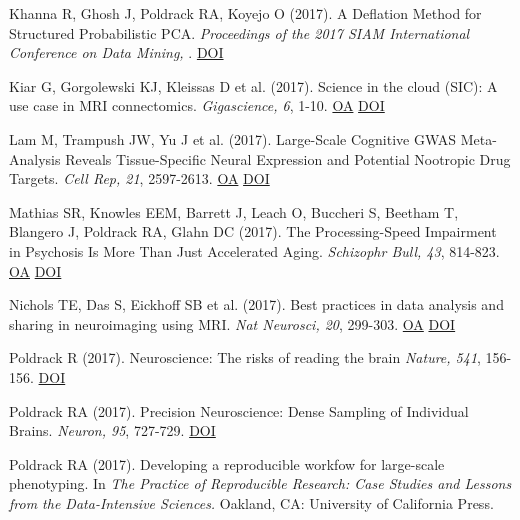 \documentclass[10pt, letterpaper]{article}
\begin{document}
Khanna R, Ghosh J, Poldrack RA,  Koyejo O (2017). A Deflation Method for Structured Probabilistic PCA. \textit{Proceedings of the 2017 SIAM International Conference on Data Mining, }. \href{http://dx.doi.org/10.1137/1.9781611974973.60}{DOI} \vspace{2mm}

Kiar G, Gorgolewski KJ, Kleissas D et al. (2017). Science in the cloud (SIC): A use case in MRI connectomics. \textit{Gigascience, 6}, 1-10. \href{https://www.ncbi.nlm.nih.gov/pmc/articles/PMC5467033}{OA} \href{http://dx.doi.org/10.1093/gigascience/gix013}{DOI} \vspace{2mm}

Lam M, Trampush JW, Yu J et al. (2017). Large-Scale Cognitive GWAS Meta-Analysis Reveals Tissue-Specific Neural Expression and Potential Nootropic Drug Targets. \textit{Cell Rep, 21}, 2597-2613. \href{https://www.ncbi.nlm.nih.gov/pmc/articles/PMC5789458}{OA} \href{http://dx.doi.org/10.1016/j.celrep.2017.11.028}{DOI} \vspace{2mm}

Mathias SR, Knowles EEM, Barrett J, Leach O, Buccheri S, Beetham T, Blangero J, Poldrack RA, Glahn DC (2017). The Processing-Speed Impairment in Psychosis Is More Than Just Accelerated Aging. \textit{Schizophr Bull, 43}, 814-823. \href{https://www.ncbi.nlm.nih.gov/pmc/articles/PMC5472152}{OA} \href{http://dx.doi.org/10.1093/schbul/sbw168}{DOI} \vspace{2mm}

Nichols TE, Das S, Eickhoff SB et al. (2017). Best practices in data analysis and sharing in neuroimaging using MRI. \textit{Nat Neurosci, 20}, 299-303. \href{https://www.ncbi.nlm.nih.gov/pmc/articles/PMC5685169}{OA} \href{http://dx.doi.org/10.1038/nn.4500}{DOI} \vspace{2mm}

Poldrack R (2017). Neuroscience: The risks of reading the brain \textit{Nature, 541}, 156-156. \href{http://dx.doi.org/10.1038/541156a}{DOI} \vspace{2mm}

Poldrack RA (2017). Precision Neuroscience: Dense Sampling of Individual Brains. \textit{Neuron, 95}, 727-729. \href{http://dx.doi.org/10.1016/j.neuron.2017.08.002}{DOI} \vspace{2mm}

Poldrack RA (2017). Developing a reproducible workfow for large-scale phenotyping. In \textit{The Practice of Reproducible Research: Case Studies and Lessons from the Data-Intensive Sciences.} Oakland, CA: University of California Press. \vspace{2mm}
\end{document}
